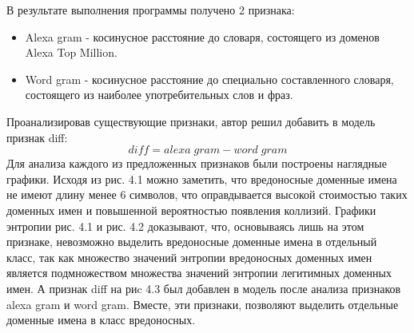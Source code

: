В результате выполнения программы получено 2 признака:
    \begin{itemize}
    \item Alexa gram - косинусное расстояние до словаря, состоящего из доменов Alexa Top Million.
    \item Word gram - косинусное расстояние до специально составленного словаря, состоящего из наиболее употребительных слов и фраз.
    \end{itemize}
    Проанализировав существующие признаки, автор решил добавить в модель признак diff:
    \begin{equation}
    diff = alexa\;gram-word\;gram
    \end{equation}
    Для анализа каждого из предложенных признаков были построены наглядные графики. Исходя из рис. 4.1 можно заметить, что вредоносные доменные имена не имеют длину менее 6 символов, что оправдывается высокой стоимостью таких доменных имен и повышенной вероятностью появления коллизий. Графики энтропии рис. 4.1 и рис. 4.2 доказывают, что, основываясь лишь на этом признаке, невозможно выделить вредоносные доменные имена в отдельный класс, так как множество значений энтропии вредоносных доменных имен является подмножеством множества значений энтропии легитимных доменных имен. А признак diff на риc 4.3 был добавлен в модель после анализа признаков alexa gram и word gram. Вместе, эти признаки, позволяют выделить отдельные доменные имена в класс вредоносных.

